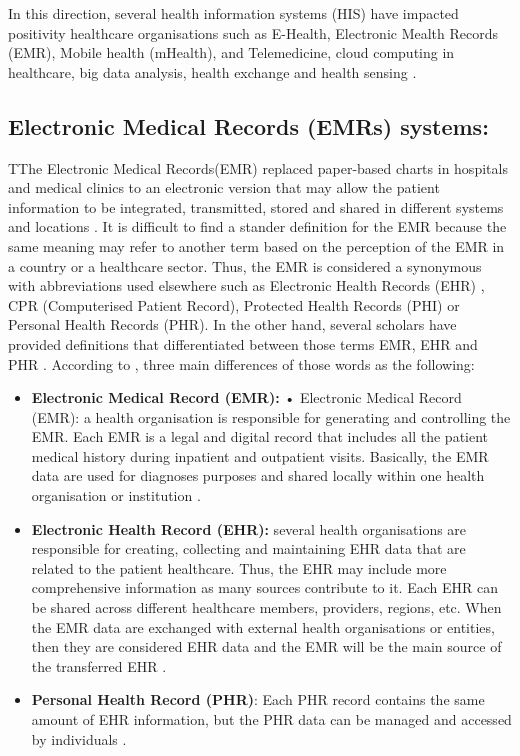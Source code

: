 In this direction, several health information systems (HIS) have impacted positivity healthcare organisations such as E-Health, Electronic Mealth Records (EMR), Mobile health (mHealth),
and Telemedicine, cloud computing in healthcare, 
big data analysis,
health exchange and health sensing  \cite{WorldHealthOrganization2016,Yang2015}. 


\subsection{Electronic Medical Records (EMRs) systems:}

TThe Electronic Medical Records(EMR) replaced paper-based charts in hospitals and medical clinics to an electronic version that may allow the patient information to be integrated, transmitted, stored and shared in different systems and locations  \cite{Rahim2016}. It is difficult to find a stander definition for the EMR because the same meaning may refer to another term based on the perception of the EMR in a country or a healthcare sector. Thus, the EMR is considered a synonymous with abbreviations used elsewhere such as Electronic Health Records (EHR) \cite{WorldHealthOrganization2016,Rahim2016}, CPR (Computerised Patient Record), Protected Health Records (PHI) or Personal Health Records (PHR). In the other hand, several scholars have provided definitions that differentiated between those terms EMR, EHR and PHR \cite{Kierkegaard2011,Deutsch2010} . According to \cite{Yang2015,U.S.DepartmentofHealthandHumanServices2015}, three main differences of those words as the following:
\begin{itemize}
	\item\textbf{ Electronic Medical Record (EMR):} •	Electronic Medical Record (EMR): a health organisation is responsible for generating and controlling the EMR. Each EMR is a legal and digital record that includes all the patient medical history during inpatient and outpatient visits. Basically, the EMR data are used for diagnoses purposes and shared locally within one health organisation or institution \cite{Yang2015}. 
	\item \textbf{Electronic Health Record (EHR):} several health organisations are responsible for creating, collecting and maintaining EHR data that are related to the patient healthcare. Thus, the EHR may include more comprehensive information as many sources contribute to it. Each EHR can be shared across different healthcare members, providers, regions, etc. 
	When the EMR data are exchanged with external health organisations or entities, then they are considered EHR data and the EMR will be the main source of the transferred EHR \cite{Yang2015}.  
	\item \textbf{Personal Health Record (PHR)}: Each PHR record contains the same amount of EHR information, but the PHR data can be managed and accessed by individuals \cite{Yang2015,U.S.DepartmentofHealthandHumanServices2015}.
\end{itemize}

